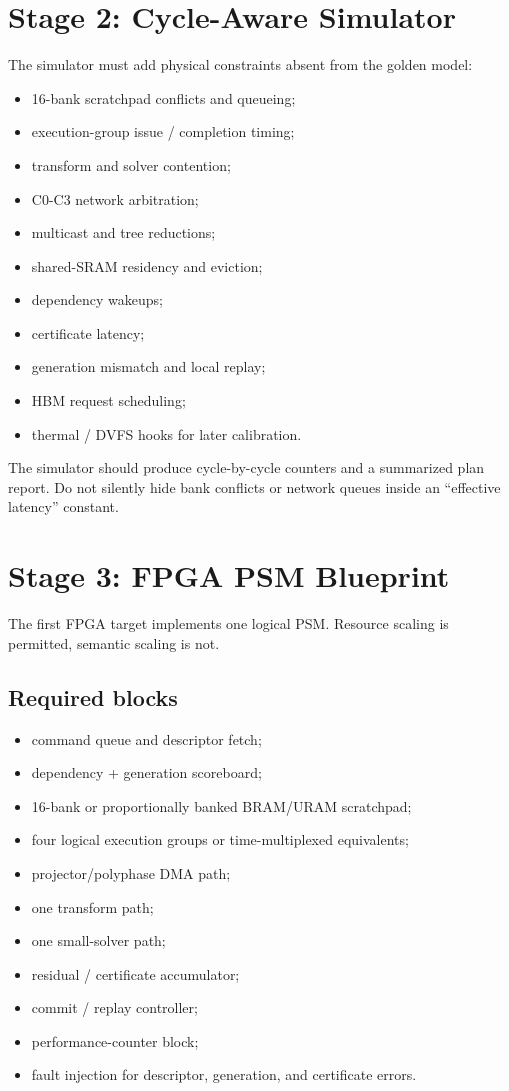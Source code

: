 \documentclass[10pt,letterpaper]{article}
\begin{document}
{{\section{Stage 2: Cycle-Aware Simulator}

The simulator must add physical constraints absent from the golden model:

\begin{itemize}
\item 16-bank scratchpad conflicts and queueing;
\item execution-group issue / completion timing;
\item transform and solver contention;
\item C0-C3 network arbitration;
\item multicast and tree reductions;
\item shared-SRAM residency and eviction;
\item dependency wakeups;
\item certificate latency;
\item generation mismatch and local replay;
\item HBM request scheduling;
\item thermal / DVFS hooks for later calibration.
\end{itemize}

The simulator should produce cycle-by-cycle counters and a summarized plan report. Do not silently hide bank conflicts or network queues inside an ``effective latency'' constant.

\section{Stage 3: FPGA PSM Blueprint}

The first FPGA target implements one logical PSM. Resource scaling is permitted, semantic scaling is not.

\subsection{Required blocks}

\begin{itemize}
\item command queue and descriptor fetch;
\item dependency + generation scoreboard;
\item 16-bank or proportionally banked BRAM/URAM scratchpad;
\item four logical execution groups or time-multiplexed equivalents;
\item projector/polyphase DMA path;
\item one transform path;
\item one small-solver path;
\item residual / certificate accumulator;
\item commit / replay controller;
\item performance-counter block;
\item fault injection for descriptor, generation, and certificate errors.
\end{itemize}

}}
\end{document}
